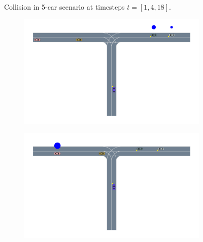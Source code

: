 \begin{figure}
\begin{subfigure}[t]{0.7\textwidth}
\end{subfigure}
    \caption{Collision in 5-car scenario at timesteps $t=[1,4,18]$.}
    \label{fig:five_car_collision1}
    \vspace{-0.2in}
\end{figure}


\begin{figure}
    \centering
   \begin{subfigure}[t]{0.7\textwidth}
        \centering
        \includegraphics[width=\textwidth, trim={2cm 5cm 1cm 0},clip]{figures/problem_decomposition/f2_1.pdf}
    \end{subfigure}
    \begin{subfigure}[t]{0.7\textwidth}
        \centering
        \includegraphics[width=\textwidth, trim={2cm 5cm 1cm 0},clip]{figures/problem_decomposition/f2_8.pdf}
    \end{subfigure}
    \begin{subfigure}[t]{0.7\textwidth}
    \centering

\end{subfigure}
\end{figure}

